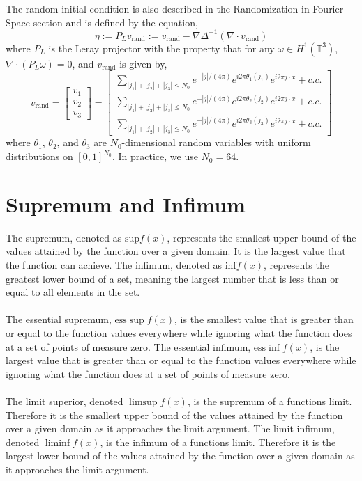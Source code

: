 \documentclass[12pt]{article}
\begin{document}
\begin{flushleft}
The random initial condition is also described in the Randomization in Fourier Space section and is defined by the equation,
$$\eta := P_L v_{\text{rand}} := v_{\text{rand}} - \nabla \Delta^{-1}(\nabla \cdot v_{\text{rand}})$$
where $P_L$ is the Leray projector with the property that for any $\omega\in H^1(\mathbb{T}^3)$, $\nabla\cdot (P_L \omega) = 0$, and $v_{\text{rand}}$ is given by,
$$v_{\text{rand}} = \begin{bmatrix}
v_1\\
v_2\\
v_3
\end{bmatrix} = 
\begin{bmatrix}
\sum_{|j_1|+|j_2|+|j_3|\leq N_0}e^{-|j|/(4\pi)}e^{i2\pi\theta_1(j_1)}e^{i2\pi j\cdot x}+c.c.\\
\sum_{|j_1|+|j_2|+|j_3|\leq N_0}e^{-|j|/(4\pi)}e^{i2\pi\theta_2(j_2)}e^{i2\pi j\cdot x}+c.c.\\
\sum_{|j_1|+|j_2|+|j_3|\leq N_0}e^{-|j|/(4\pi)}e^{i2\pi\theta_3(j_3)}e^{i2\pi j\cdot x}+c.c.
\end{bmatrix}$$
where $\theta_1$, $\theta_2$, and $\theta_3$ are $N_0$-dimensional random variables with uniform distributions on $[0,1]^{N_0}$. In practice, we use $N_0=64$.

\section{Supremum and Infimum}

\qquad The supremum, denoted as $\text{sup} f(x)$, represents the smallest upper bound of the values attained by the function over a given domain. It is the largest value that the function can achieve. The infimum, denoted as $\text{inf} f(x)$, represents the greatest lower bound of a set, meaning the largest number that is less than or equal to all elements in the set.
\\~\\
\qquad The essential supremum, $\text{ess} \sup f(x)$, is the smallest value that is greater than or equal to the function values everywhere while ignoring what the function does at a set of points of measure zero. The essential infimum, $\text{ess} \inf f(x)$, is the largest value that is greater than or equal to the function values everywhere while ignoring what the function does at a set of points of measure zero.
\\~\\
\qquad The limit superior, denoted $\limsup f(x)$, is the supremum of a functions limit. Therefore it is the smallest upper bound of the values attained by the function over a given domain as it approaches the limit argument. The limit infimum, denoted $\liminf f(x)$,  is the infimum of a functions limit. Therefore it is the largest lower bound of the values attained by the function over a given domain as it approaches the limit argument.


\end{flushleft}
\end{document}
